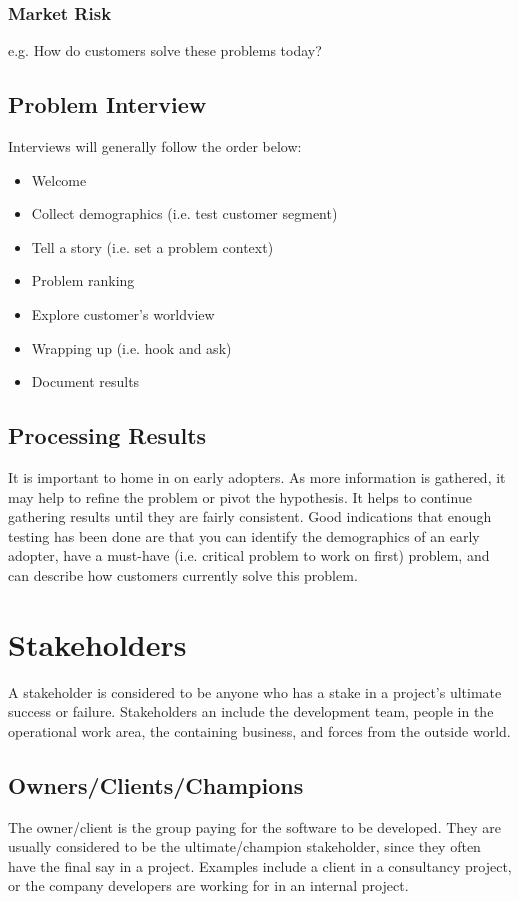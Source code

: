 \documentclass[12pt,titlepage]{article}
\begin{document}
        \subsubsection{Market Risk}
          e.g. How do customers solve these problems today?

    \subsection{Problem Interview}
      Interviews will generally follow the order below:
      \begin{itemize}
        \item Welcome
        \item Collect demographics (i.e. test customer segment)
        \item Tell a story (i.e. set a problem context)
        \item Problem ranking
        \item Explore customer's worldview
        \item Wrapping up (i.e. hook and ask)
        \item Document results
      \end{itemize}

    \subsection{Processing Results}
      It is important to home in on early adopters. As more information is gathered, it may help to refine the problem or pivot the hypothesis.
      It helps to continue gathering results until they are fairly consistent. Good indications that enough testing has been done are that
      you can identify the demographics of an early adopter, have a must-have (i.e. critical problem to work on first) problem, and can describe
      how customers currently solve this problem.

  \newpage

  \section{Stakeholders}
    A stakeholder is considered to be anyone who has a stake in a project's ultimate success or failure. Stakeholders an include the development
    team, people in the operational work area, the containing business, and forces from the outside world.

    \subsection{Owners/Clients/Champions}
      The owner/client is the group paying for the software to be developed. They are usually considered to be the ultimate/champion stakeholder,
      since they often have the final say in a project. Examples include a client in a consultancy project, or the company developers are working
      for in an internal project.
\end{document}
